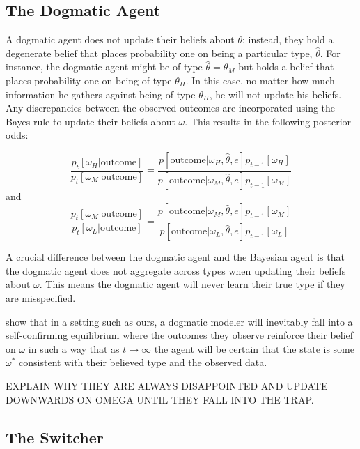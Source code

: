 \documentclass[
  12pt,
]{article}
\begin{document}
\hypertarget{the-dogmatic-agent}{%
\subsection{The Dogmatic Agent}\label{the-dogmatic-agent}}

A dogmatic agent does not update their beliefs about \(\theta\);
instead, they hold a degenerate belief that places probability one on
being a particular type, \(\hat{\theta}\). For instance, the dogmatic
agent might be of type \(\hat{\theta} = \theta_M\) but holds a belief
that places probability one on being of type \(\theta_H\). In this case,
no matter how much information he gathers against being of type
\(\theta_H\), he will not update his beliefs. Any discrepancies between
the observed outcomes are incorporated using the Bayes rule to update
their beliefs about \(\omega\). This results in the following posterior
odds:

\begin{equation}
\frac{p_{t}[\omega_H|\text{outcome}]}{p_{t}[\omega_M|\text{outcome}]} = 
      \frac{p[\text{outcome}|\omega_H, \hat{\theta}, e]p_{t-1}[\omega_H]}{p[\text{outcome}|\omega_M, \hat{\theta}, e]p_{t-1}[\omega_M]}
\end{equation} and \begin{equation}
\frac{p_{t}[\omega_M|\text{outcome}]}{p_{t}[\omega_L|\text{outcome}]} = 
      \frac{p[\text{outcome}|\omega_M, \hat{\theta}, e]p_{t-1}[\omega_M]}{p[\text{outcome}|\omega_L, \hat{\theta}, e]p_{t-1}[\omega_L]}
\end{equation}

A crucial difference between the dogmatic agent and the Bayesian agent
is that the dogmatic agent does not aggregate across types when updating
their beliefs about \(\omega\). This means the dogmatic agent will never
learn their true type if they are misspecified.

\citet{Heidhues2018} show that in a setting such as ours, a dogmatic
modeler will inevitably fall into a self-confirming equilibrium where
the outcomes they observe reinforce their belief on \(\omega\) in such a
way that as \(t\to\infty\) the agent will be certain that the state is
some \(\omega^*\) consistent with their believed type and the observed
data.

EXPLAIN WHY THEY ARE ALWAYS DISAPPOINTED AND UPDATE DOWNWARDS ON OMEGA
UNTIL THEY FALL INTO THE TRAP.

\hypertarget{the-switcher}{%
\subsection{The Switcher}\label{the-switcher}}
\end{document}

